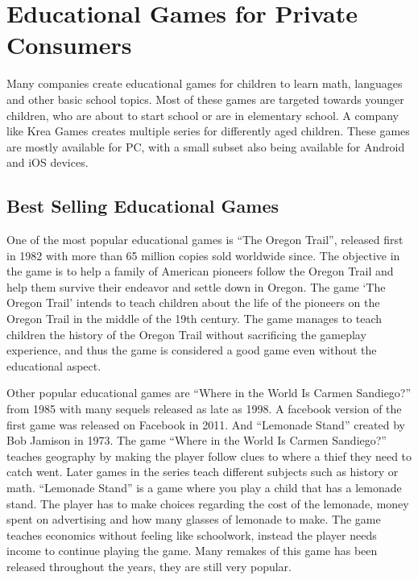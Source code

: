 \section{Educational Games for Private Consumers}
\label{sec:privateconsumers}
Many companies create educational games for children to learn math, languages and other basic school topics. Most of these games are targeted towards younger children, who are about to start school or are in elementary school. A company like Krea Games \cite{kreagames} creates multiple series for differently aged children. These games are mostly available for PC, with a small subset also being available for Android and iOS devices.

\subsection{Best Selling Educational Games}
One of the most popular educational games is ``The Oregon Trail'', released first in 1982 with more than 65 million copies sold worldwide since.\cite{oregontrail} The objective in the game is to help a family of American pioneers follow the Oregon Trail and help them survive their endeavor and settle down in Oregon.
The game `The Oregon Trail' intends to teach children about the life of the pioneers on the Oregon Trail in the middle of the 19th century. The game manages to teach children the history of the Oregon Trail without sacrificing the gameplay experience, and thus the game is considered a good game even without the educational aspect.

Other popular educational games are ``Where in the World Is Carmen Sandiego?'' from 1985 with many sequels released as late as 1998.\cite{carmensandiego} A facebook version of the first game was released on Facebook in 2011. And ``Lemonade Stand'' created by Bob Jamison in 1973.\cite{lemonadestand}
The game ``Where in the World Is Carmen Sandiego?'' teaches geography by making the player follow clues to where a thief they need to catch went. Later games in the series teach different subjects such as history or math.
``Lemonade Stand'' is a game where you play a child that has a lemonade stand. The player has to make choices regarding the cost of the lemonade, money spent on advertising and how many glasses of lemonade to make. The game teaches economics without feeling like schoolwork, instead the player needs income to continue playing the game. Many remakes of this game has been released throughout the years, they are still very popular.

